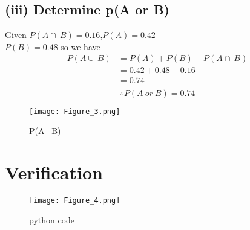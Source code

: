 \documentclass[journal,12pt,twocolumn]{article}
\begin{document}
\subsection*{(iii) Determine p(A or B)}
Given ${P(A\cap\ B) = 0.16}$,${P(A) = 0.42}$ \\
${P(B) =0.48}$ so we have\\
\begin{align*}
    P(A \cup\ B) &=P(A) + P(B) - P(A \cap\ B) \\
                &= 0.42 + 0.48 - 0.16 \\ 
                &= 0.74 \\
\end{align*}
\begin{equation}
 \therefore P(A\ or \ B) = 0.74  
\end{equation}
\begin{figure}[H]
    \centering
    \texttt{[image: Figure\_3.png]}
    \caption{P(A \cup\ B)}
    \label{fig:3}
\end{figure}


\section*{Verification}

\begin{figure}[H]
    \centering
    \texttt{[image: Figure\_4.png]}
    \caption{python code}
    \label{fig:4}
\end{figure}
\end{document}
